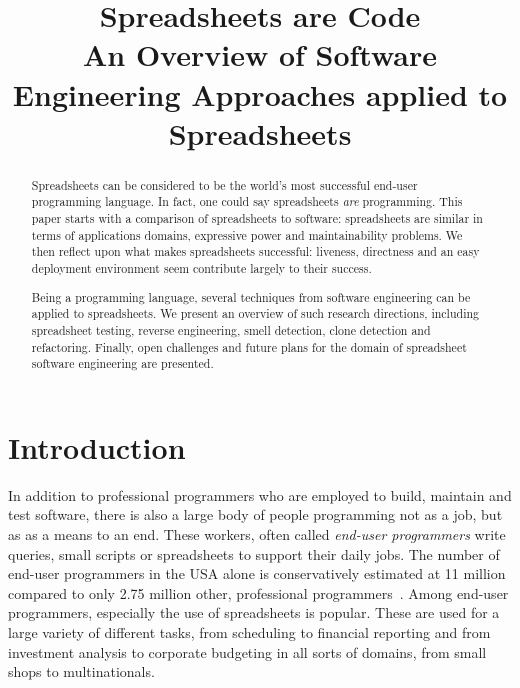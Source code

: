 \documentclass[conference]{IEEEtran}
\begin{document}
\title{Spreadsheets are Code \large{\\An Overview of Software Engineering Approaches applied to Spreadsheets}}


\author{
}


\maketitle

\begin{abstract}
Spreadsheets can be considered to be the world's most successful end-user programming language. In fact, one could say spreadsheets \emph{are} programming. This paper starts with a comparison of spreadsheets to software: spreadsheets are similar in terms of applications domains, expressive power and maintainability problems. We then reflect upon what makes spreadsheets successful: liveness, directness and an easy deployment environment seem contribute largely to their success.

Being a programming language, several techniques from software engineering can be applied to spreadsheets. We present an overview of such research directions, including spreadsheet testing, reverse engineering, smell detection, clone detection and refactoring. Finally, open challenges and future plans for the domain of spreadsheet software engineering are presented.
\end{abstract}

\IEEEpeerreviewmaketitle

\section{Introduction}
In addition to professional programmers who are employed to build, maintain and test software, there is also a large body of people programming not as a job, but as as a means to an end. These workers, often called \emph {end-user programmers} write queries, small scripts or spreadsheets to support their daily jobs. The number of end-user programmers in the USA alone is conservatively estimated at 11 million compared to only 2.75 million other, professional programmers~\cite{Scaf2005}. Among end-user programmers, especially the use of spreadsheets is popular. These are used for a large variety of different tasks, from scheduling to financial reporting and from investment analysis to corporate budgeting in all sorts of domains, from small shops to multinationals. 
\end{document}
